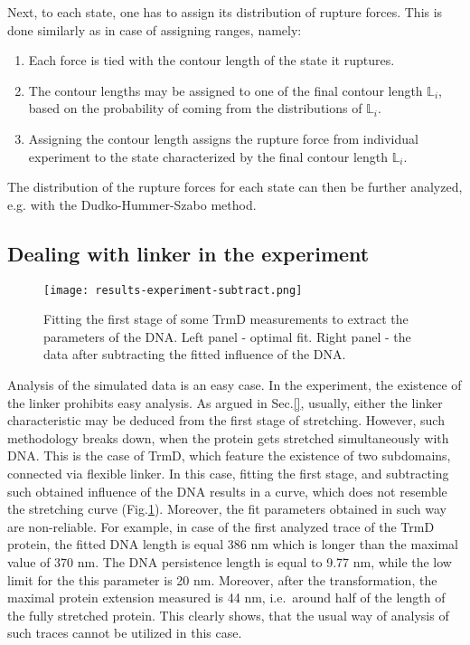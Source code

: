 Next, to each state, one has to assign its distribution of rupture forces.
This is done similarly as in case of assigning ranges, namely:
\begin{enumerate}
    \item Each force is tied with the contour length of the state it ruptures.
    \item The contour lengths may be assigned to one of the final contour length $\mathbb{L}_i$, based on the probability of coming from the distributions of $\mathbb{L}_i$.
    \item Assigning the contour length assigns the rupture force from individual experiment to the state characterized by the final contour length $\mathbb{L}_i$.
\end{enumerate}

The distribution of the rupture forces for each state can then be further analyzed, e.g. with the Dudko-Hummer-Szabo method.

\subsection{Dealing with linker in the experiment}
\label{subsec:results-approach-linker}
\begin{figure}
    \texttt{[image: results-experiment-subtract.png]}
    \caption{Fitting the first stage of some TrmD measurements to extract the parameters of the DNA. Left panel - optimal fit. Right panel - the data after subtracting the fitted influence of the DNA.}
    \label{fig:results-approach-linker-subtract}
\end{figure}

Analysis of the simulated data is an easy case.
In the experiment, the existence of the linker prohibits easy analysis.
As argued in Sec.\ref{}, usually, either the linker characteristic may be deduced from the first stage of stretching.
However, such methodology breaks down, when the protein gets stretched simultaneously with DNA\@.
This is the case of TrmD, which feature the existence of two subdomains, connected via flexible linker.
In this case, fitting the first stage, and subtracting such obtained influence of the DNA results in a curve, which does not resemble the stretching curve (Fig.\ref{fig:results-approach-linker-subtract}).
Moreover, the fit parameters obtained in such way are non-reliable.
For example, in case of the first analyzed trace of the TrmD protein, the fitted DNA length is equal 386 nm which is longer than the maximal value of 370 nm.
The DNA persistence length is equal to 9.77 nm, while the low limit for the this parameter is 20 nm.
Moreover, after the transformation, the maximal protein extension measured is 44 nm, i.e.\ around half of the length of the fully stretched protein.
This clearly shows, that the usual way of analysis of such traces cannot be utilized in this case.

